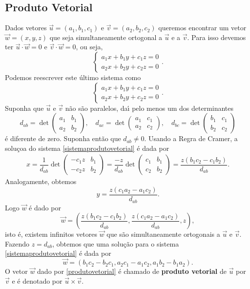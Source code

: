 \subsection{Produto Vetorial} %
\label{sub:produto_vetorial}
Dados vetores $\vec{u} = (a_1,b_1,c_1)$ e $\vec{v} = (a_2,b_2,c_2)$ queremos encontrar um vetor $\vec{w} = (x,y,z)$ que seja simultaneamente ortogonal a $\vec{u}$ e a $\vec{v}$. Para isso devemos ter $\vec{u}\cdot\vec{w} = 0$ e $\vec{v}\cdot\vec{w} = 0$, ou seja,
\[
  \begin{cases}
    a_1x + b_1y + c_1z = 0\\
    a_2x + b_2y + c_2z = 0
  \end{cases}.
\]
Podemos reescrever este \'ultimo sistema como
\begin{equation}\label{sistemaprodutovetorial}
  \begin{cases}
    a_1x + b_1y + c_1z = 0\\
    a_2x + b_2y + c_2z = 0
  \end{cases}.
\end{equation}
Suponha que $\vec{u}$ e $\vec{v}$ n\~ao s\~ao paralelos, da{\'\i} pelo menos um dos determinantes
\[
d_{ab} = \det \begin{pmatrix}
  a_1 & b_1\\
  a_2 & b_2
\end{pmatrix}, \quad d_{ac} = \det \begin{pmatrix}
  a_1 & c_1\\
  a_2 & c_2
\end{pmatrix},\quad d_{bc} = \det \begin{pmatrix}
  b_1 & c_1\\
  b_2 & c_2
\end{pmatrix}
\]
\'e diferente de zero. Suponha ent\~ao que $d_{ab} \ne 0$. Usando a Regra de Cramer, a solu\c{c}oa do sistema \eqref{sistemaprodutovetorial} \'e dada por
\begin{align*}
  x = \dfrac{1}{d_{ab}}\det \begin{pmatrix}
  -c_1z & b_1\\
  -c_2z & b_2
\end{pmatrix} = \dfrac{-z}{d_{ab}}\det \begin{pmatrix}
  c_1 & b_1\\
  c_2 & b_2
\end{pmatrix} = \dfrac{z(b_1c_2 - c_1b_2)}{d_{ab}}.
\end{align*}
Analogamente, obtemos
\[
  y = \dfrac{z(c_1a_2 - a_1c_2)}{d_{ab}}.
\]
Logo $\vec{w}$ \'e dado por
\[
  \vec{w} = \left(\dfrac{z(b_1c_2 - c_1b_2)}{d_{ab}}, \dfrac{z(c_1a_2 - a_1c_2)}{d_{ab}}, z\right),
\]
isto \'e, existem infinitos vetores $\vec{w}$ que s\~ao simultaneamente ortogonais a $\vec{u}$ e $\vec{v}$. Fazendo $z = d_{ab}$, obtemos que uma solu\c{c}\~ao para o sistema \eqref{sistemaprodutovetorial} \'e dada por
\begin{equation}\label{produtovetorial}
  \vec{w} = (b_1c_2 - b_2c_1, a_2c_1 - a_1c_2, a_1b_2 - b_1a_2).
\end{equation}
O vetor $\vec{w}$ dado por \eqref{produtovetorial} \'e chamado de \textbf{produto vetorial} de $\vec{u}$ por $\vec{v}$ e \'e denotado por $\vec{u}\times\vec{v}$.

